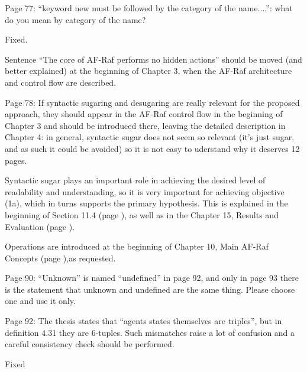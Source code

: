 \documentclass{article}
\newcommand{\todo}[1]{[\textcolor{red}{TODO}: #1]}
\newenvironment{them}{\noindent\begingroup\color{blue}}{\endgroup\par}
\begin{document}
\begin{them}

Page 77:
“keyword new must be followed by the category of the name....”: what do you
mean by category of the name?

\end{them}
Fixed.

\begin{them}

Sentence “The core of AF-Raf performs no hidden actions” should be moved (and
better explained) at the beginning of Chapter 3, when the AF-Raf architecture
and control flow are described.

\end{them}
\todo{}

\begin{them}

Page 78:
If syntactic sugaring and desugaring are really relevant for the proposed
approach, they should appear in the AF-Raf control flow in the beginning of
Chapter 3 and should be introduced there, leaving the detailed description in
Chapter 4: in general, syntactic sugar does not seem so relevant (it's just
sugar, and as such it could be avoided) so it is not easy to uderstand why it
deserves 12 pages.

\end{them}

Syntactic sugar plays an important role in achieving the desired level of
readability and understanding, so it is very important for achieving objective
(1a), which in turns supports the primary hypothesis. This is explained in the
beginning of Section 11.4 (page ), as well as in the Chapter 15, Results and
Evaluation (page ).

Operations are introduced at the beginning of Chapter 10, Main AF-Raf Concepts
(page ),as requested.

\begin{them}

Page 90:
“Unknown” is named “undefined” in page 92, and only in page 93 there is the
statement that unknown and undefined are the same thing. Please choose one and
use it only.

\end{them}
\todo{}

\begin{them}

Page 92:
The thesis states that “agents states themselves are triples”, but in
definition 4.31 they are 6-tuples.  Such mismatches raise a lot of confusion
and a careful consistency check should be performed.

\end{them}
Fixed
\end{document}
